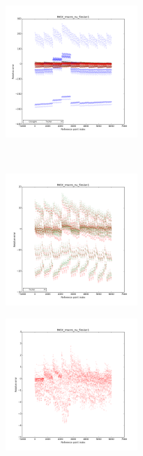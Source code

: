 \begin{center}
\begin{figure}[!h]
    \centering
    \begin{subfigure}[b]{0.45\textwidth}
				\includegraphics[width=\linewidth,height=5cm]{images/MOX/MOX_macro_nu_fission1_with_cocagne.png}
    \end{subfigure}
		~
    \begin{subfigure}[b]{0.45\textwidth}
        \includegraphics[width=\linewidth,height=5cm]{images/MOX/MOX_macro_nu_fission1.png}
    \end{subfigure}

		\begin{subfigure}[b]{0.45\textwidth}
				\includegraphics[width=\linewidth,height=5cm]{images/MOX/MOX_macro_nu_fission1_alone.png}
		\end{subfigure}
\end{figure}
\end{center}
